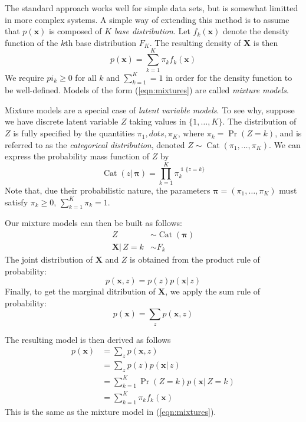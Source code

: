 \documentclass[final,3p,times,twocolumn]{elsarticle}
\DeclareMathOperator*{\Cat}{Cat}
\let\bs\boldsymbol
\DeclareMathOperator*{\id}{\mathds{1}}
\begin{document}
The standard approach works well for simple data sets, but is somewhat limitted in more complex systems.
A simple way of extending this method is to assume that $p(\bs x)$ is composed of $K$ \emph{base distribution}.
Let $f_k(\bs x)$ denote the density function of the $k$th base distribution $F_K$.
The resulting density of $\bs X$ is then
\begin{equation}
\label{eqn:mixtures}
p(\bs x) = \sum_{k=1}^K \pi_k f_k(\bs x)
\end{equation}
We require $pi_k \geq 0$ for all $k$ and $\sum_{k=1}^K = 1$ in order for the density function to be well-defined.
Models of the form (\ref{eqn:mixtures}) are called \emph{mixture models}.

Mixture models are a special case of \emph{latent variable models}.
To see why, suppose we have discrete latent variable $Z$ taking values in $\{1,\dots,K\}$.
The distribution of $Z$ is fully specified by the quantities $\pi_1,dots,\pi_K$, where $\pi_k = \Pr(Z = k)$, and is referred to as the \emph{categorical distribution}, denoted $Z \sim \Cat(\pi_1, \dots,\pi_K)$.
We can express the probability mass function of $Z$ by
\begin{equation}
\label{eqn:cat}
\Cat(z|\,\bs\pi) = \prod_{k=1}^K \pi_k^{\id\{z=k\}}
\end{equation}
Note that, due their probabilistic nature, the parameters $\bs \pi = (\pi_1,\dots,\pi_K)$ must satisfy $\pi_k \geq 0$, $\sum_{k=1}^K \pi_k = 1$.

Our mixture models can then be built as follows:
\begin{equation}
\begin{split}
\label{eqn:mixture-lvm}
Z &\sim \Cat(\bs\pi)\\
\bs X |\,Z=k &\sim F_k
\end{split}
\end{equation}
The joint distribution of $\bs X$ and $Z$ is obtained from the product rule of probability:
\begin{equation}
\label{eqn:product-rule}
p(\bs x, z) = p(z)p(\bs x|\,z)
\end{equation}
Finally, to get the marginal ditribution of $\bs X$, we apply the sum rule of probability:
\begin{equation}
\label{eqn:sum-rule}
p(\bs x) = \sum_z p(\bs x, z)
\end{equation}

The resulting model is then derived as follows
\begin{equation}
\label{eqn:mixture-derivation}
\begin{split}
p(\bs x) &= \sum_z p(\bs x, z)\\
&= \sum_z p(z)p(\bs x|\,z)\\
&= \sum_{k=1}^K \Pr(Z=k) p(\bs x|\,Z=k)\\
&= \sum_{k=1}^K \pi_k f_k(\bs x)
\end{split}
\end{equation}
This is the same as the mixture model in (\ref{eqn:mixtures}).
\end{document}
